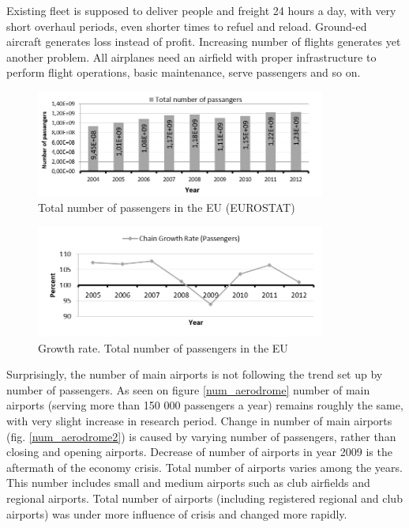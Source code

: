 Existing fleet is supposed to deliver people and freight 24 hours a day, with very short overhaul periods, even shorter times to refuel and reload. Ground-ed aircraft generates loss instead of profit. Increasing number of flights generates yet another problem. All airplanes need an airfield with proper infrastructure to perform flight operations, basic maintenance, serve passengers and so on.

\begin{figure}[h!]
\centering %
\includegraphics[width=0.85\textwidth]{Pictures/num_pass.png}
\caption{Total number of passengers in the EU (EUROSTAT)}
\label{num_pass}
\end{figure}

\begin{figure}[h!]
\centering %
\includegraphics[width=0.85\textwidth]{Pictures/num_pass2.png}
\caption{Growth rate. Total number of passengers in the EU}
\label{num_pass2}
\end{figure}

Surprisingly, the number of main airports is not following the trend set up by number of passengers.  As seen on figure \ref{num_aerodrome} number of main airports (serving more than 150 000 passengers a year) remains roughly the same, with very slight increase in research period. Change in number of main airports (fig. \ref{num_aerodrome2}) is caused by varying number of passengers, rather than closing and opening airports. Decrease of number of airports in year 2009 is the aftermath of the economy crisis. Total number of airports varies among the years. This number includes small and medium airports such as club airfields and regional airports. Total number of airports (including registered regional and club airports) was under more influence of crisis and changed more rapidly.

